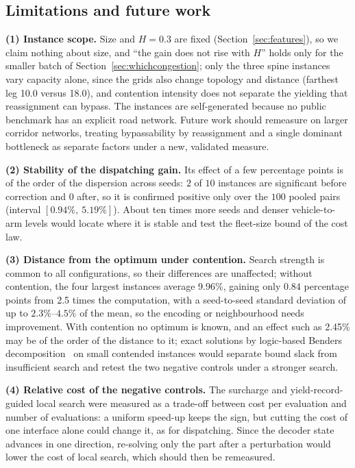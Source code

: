 \documentclass[preprint,review,12pt,authoryear,doubleblind]{elsarticle}
\newcommand{\NCases}{10}
\newcommand{\NPairs}{100}
\newcommand{\GainProbeLoop}{2.45\%}      %
\newcommand{\CIProbeLoop}{$[0.94\%,\ 5.19\%]$}
\newcommand{\CellsSigProbe}{2}
\newcommand{\CellsSigProbeAdj}{0}
\newcommand{\LegDumbbell}{10.0}          %
\newcommand{\LegGrid}{18.0}              %
\newcommand{\PubGapBig}{9.96\%}           %
\newcommand{\PubBudgetRatio}{2.5}
\newcommand{\PubBudgetGainPP}{0.84}       %
\newcommand{\PubCvBig}{$2.3\%$--$4.5\%$} %
\begin{document}
\subsection{Limitations and future work}
\label{sec:limitations}
\label{sec:future_work}

\textbf{(1) Instance scope.}
Size and $H=0.3$ are fixed (Section~\ref{sec:features}), so we claim nothing about size, and ``the gain does not rise with $H$'' holds only for the smaller batch of Section~\ref{sec:whichcongestion}; only the three spine instances vary capacity alone, since the grids also change topology and distance (farthest leg \LegDumbbell{} versus \LegGrid{}), and contention intensity does not separate the yielding that reassignment can bypass. The instances are self-generated because no public benchmark has an explicit road network. Future work should remeasure on larger corridor networks, treating bypassability by reassignment and a single dominant bottleneck as separate factors under a new, validated measure.

\textbf{(2) Stability of the dispatching gain.}
Its effect of a few percentage points is of the order of the dispersion across seeds: $\CellsSigProbe$ of $\NCases$ instances are significant before correction and $\CellsSigProbeAdj$ after, so it is confirmed positive only over the $\NPairs$ pooled pairs (interval \CIProbeLoop{}). About ten times more seeds and denser vehicle-to-arm levels would locate where it is stable and test the fleet-size bound of the cost law.

\textbf{(3) Distance from the optimum under contention.}
Search strength is common to all configurations, so their differences are unaffected; without contention, the four largest instances average \PubGapBig{}, gaining only $\PubBudgetGainPP$ percentage points from \PubBudgetRatio{} times the computation, with a seed-to-seed standard deviation of up to \PubCvBig{} of the mean, so the encoding or neighbourhood needs improvement. With contention no optimum is known, and an effect such as \GainProbeLoop{} may be of the order of the distance to it; exact solutions by logic-based Benders decomposition~\citep{vanos2026exact} on small contended instances would separate bound slack from insufficient search and retest the two negative controls under a stronger search.

\textbf{(4) Relative cost of the negative controls.}
The surcharge and yield-record-guided local search were measured as a trade-off between cost per evaluation and number of evaluations: a uniform speed-up keeps the sign, but cutting the cost of one interface alone could change it, as for dispatching. Since the decoder state advances in one direction, re-solving only the part after a perturbation would lower the cost of local search, which should then be remeasured.
\end{document}
